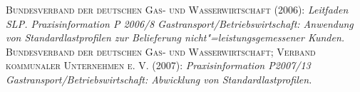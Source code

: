 \documentclass[fontsize=10pt,paper=a4,DIV=12,abstract=true,toc=bibliography,toc=listof,toc=index]{scrreprt}
\begin{document}







\appendix



\printindex

\begin{thebibliography}{BGW/VKU, 2007}
   \textsc{Bundesverband der deutschen Gas- und Wasserwirtschaft} (2006): \textit{Leitfaden SLP. Praxisinformation P 2006/8 Gastransport/Betriebswirtschaft: Anwendung von Standardlastprofilen zur Belieferung nicht"=leistungsgemessener Kunden.}
   \textsc{Bundesverband der deutschen Gas- und Wasserwirtschaft; Verband kommunaler Unternehmen e. V.} (2007): \textit{Praxisinformation P2007/13 Gastransport/Betriebswirtschaft: Abwicklung von Standardlastprofilen.}
\end{thebibliography}
\end{document}
